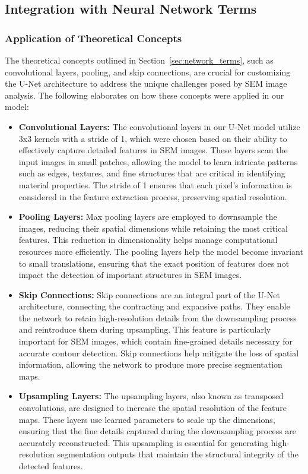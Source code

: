 \documentclass[preprint,12pt]{elsarticle}
\begin{document}
\subsection{Integration with Neural Network Terms}
\label{subsec:IntegrationNeuralNetworkTerms}

\subsubsection{Application of Theoretical Concepts}
The theoretical concepts outlined in Section~\ref{sec:network_terms}, such as convolutional layers, pooling, and skip connections, are crucial for customizing the U-Net architecture to address the unique challenges posed by SEM image analysis. The following elaborates on how these concepts were applied in our model:

\begin{itemize}
    \item \textbf{Convolutional Layers:} The convolutional layers in our U-Net model utilize 3x3 kernels with a stride of 1, which were chosen based on their ability to effectively capture detailed features in SEM images. These layers scan the input images in small patches, allowing the model to learn intricate patterns such as edges, textures, and fine structures that are critical in identifying material properties. The stride of 1 ensures that each pixel's information is considered in the feature extraction process, preserving spatial resolution.

    \item \textbf{Pooling Layers:} Max pooling layers are employed to downsample the images, reducing their spatial dimensions while retaining the most critical features. This reduction in dimensionality helps manage computational resources more efficiently. The pooling layers help the model become invariant to small translations, ensuring that the exact position of features does not impact the detection of important structures in SEM images.

    \item \textbf{Skip Connections:} Skip connections are an integral part of the U-Net architecture, connecting the contracting and expansive paths. They enable the network to retain high-resolution details from the downsampling process and reintroduce them during upsampling. This feature is particularly important for SEM images, which contain fine-grained details necessary for accurate contour detection. Skip connections help mitigate the loss of spatial information, allowing the network to produce more precise segmentation maps.

    \item \textbf{Upsampling Layers:} The upsampling layers, also known as transposed convolutions, are designed to increase the spatial resolution of the feature maps. These layers use learned parameters to scale up the dimensions, ensuring that the fine details captured during the downsampling process are accurately reconstructed. This upsampling is essential for generating high-resolution segmentation outputs that maintain the structural integrity of the detected features.
\end{itemize}
\end{document}
